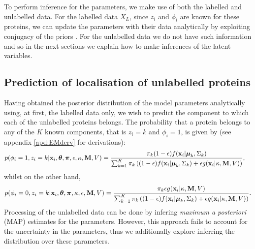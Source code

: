 \documentclass[12pt,english]{article}
\begin{document}
To perform inference for the parameters, we make use of both the labelled and unlabelled data. For the labelled data $X_L$, since $z_i$ and $\phi_i$ are
known for these proteins, we can update the parameters
with their data analytically by exploiting conjugacy of the priors \citep[see, for example,][]{Gelman:1995}. For the unlabelled data we do not have such
information and so in the next sections we explain how to make inferences of the latent variables.

\subsection{Prediction of localisation of unlabelled proteins}
Having obtained the posterior distribution of the model parameters analytically using, at first, the labelled data only, we wish to predict the component to which each of the unlabelled proteins belongs. The probability that a protein belongs to any of the $K$ known components, that is $z_i = k$ and $\phi_i = 1$, is given by (see appendix \ref{apd:EMderv} for derivations):
\begin{equation}\label{equation::estep1}
\begin{split}
p(\phi_i = 1, z_i = k|{\bf x}_i, \boldsymbol{\theta}, \boldsymbol{\pi} , \epsilon,\kappa, {\bf M}, V)  & = \frac{\pi_k(1-\epsilon)f({\bf x}_i|\boldsymbol{\mu}_k, \Sigma_{k})}{\sum_{k=1}^{K}\pi_k\left((1-\epsilon) f({\bf x}_i|\boldsymbol{\mu}_k, \Sigma_k) + \epsilon g({\bf x}_i|\kappa, {\bf M}, V)\right)},
\end{split}
\end{equation}
whilst on the other hand,
\begin{equation}\label{equation::estep2}
\begin{split}
p(\phi_i = 0, z_i = k|{\bf x}_i, \boldsymbol{\theta}, \boldsymbol{\pi},\kappa, \epsilon, {\bf M}, V)  = \frac{\pi_k \epsilon g({\bf x}_i|\kappa, {\bf M}, V)}{\sum_{k=1}^{K}\pi_k\left((1-\epsilon) f({\bf x}_i|\boldsymbol{\mu}_k, \Sigma_k) + \epsilon g({\bf x}_i|\kappa, {\bf M}, V)\right)}.
\end{split}
\end{equation}
Processing of the unlabelled data can be done by infering {\em maximum a posteriori} (MAP) estimates for the parameters. However, this approach fails to account for
the uncertainty in the parameters, thus we additionally explore inferring the distribution over these parameters.
\end{document}
